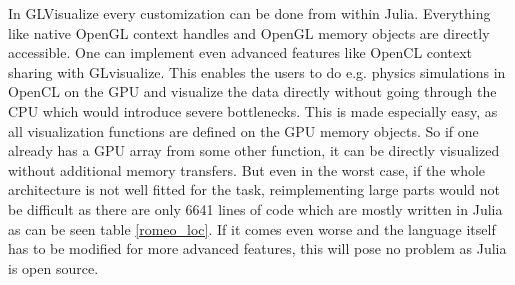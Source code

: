 In GLVisualize every customization can be done from within Julia.
Everything like native \ac{OpenGL} context handles and \ac{OpenGL} memory objects are directly accessible.
One can implement even advanced features like \ac{OpenCL} context sharing with GLvisualize\cite{OCLInterop}.
This enables the users to do e.g. physics simulations in \ac{OpenCL} on the \ac{GPU} and visualize the data directly without going through the \ac{CPU} which would introduce severe bottlenecks.
This is made especially easy, as all visualization functions are defined on the \ac{GPU} memory objects. 
So if one already has a \ac{GPU} array from some other function, it can be directly visualized without additional memory transfers.
But even in the worst case, if the whole architecture is not well fitted for the task, reimplementing large parts would not be difficult as there are only 6641 lines of code which are mostly written in Julia as can be seen table \cref{romeo_loc}.
If it comes even worse and the language itself has to be modified for more advanced features, this will pose no problem as Julia is open source.
